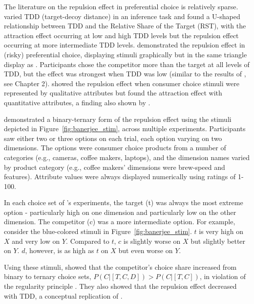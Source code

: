 The literature on the repulsion effect in preferential choice is relatively sparse. \textcite{liaoInfluenceDistanceDecoy2021} varied TDD (target-decoy distance) in an inference task and found a U-shaped relationship between TDD and the Relative Share of the Target (RST), with the attraction effect occurring at low and high TDD levels but the repulsion effect occurring at more intermediate TDD levels. \textcite{spektorRepulsionEffectPreferential2022} demonstrated the repulsion effect in (risky) preferential choice, displaying stimuli graphically but in the same triangle display as \textcite{spektorWhenGoodLooks2018b}. Participants chose the competitor more than the target at all levels of TDD, but the effect was strongest when TDD was low (similar to the results of \textcite{spektorWhenGoodLooks2018b}, see Chapter 2). \textcite{brendlPreferentialAttractionEffects2023} showed the repulsion effect when consumer choice stimuli were represented by qualitative attributes but found the attraction effect with quantitative attributes, a finding also shown by \textcite{frederickLimitsAttraction2014b}. 

\textcite{banerjeeFactorsThatPromote2024} demonstrated a binary-ternary form of the repulsion effect using the stimuli depicted in Figure~\ref{fig:banerjee_stim}, across multiple experiments. Participants saw either two or three options on each trial, each option varying on two dimensions. The options were consumer choice products from a number of categories (e.g., cameras, coffee makers, laptops), and the dimension names varied by product category (e.g., coffee makers' dimensions were brew-speed and features). Attribute values were always displayed numerically using ratings of 1-100.

In each choice set of \textcite{banerjeeFactorsThatPromote2024}'s experiments, the target (t) was always the most extreme option - particularly high on one dimension and particularly low on the other dimension. The competitor (c) was a more intermediate option. For example, consider the blue-colored stimuli in Figure~\ref{fig:banerjee_stim}. $t$ is very high on $X$ and very low on $Y$. Compared to $t$, $c$ is slightly worse on $X$ but slightly better on $Y$. $d$, however, is as high as $t$ on $X$ but even worse on $Y$. 

Using these stimuli, \textcite{banerjeeFactorsThatPromote2024} showed that the competitor's choice share increased from binary to ternary choice sets, $P(C|[T,C,D])>P(C|[T,C])$, in violation of the regularity principle \parencite{marley1989random,mackay1995probabilistic}. They also showed that the repulsion effect decreased with TDD, a conceptual replication of \textcite{spektorWhenGoodLooks2018b}.

